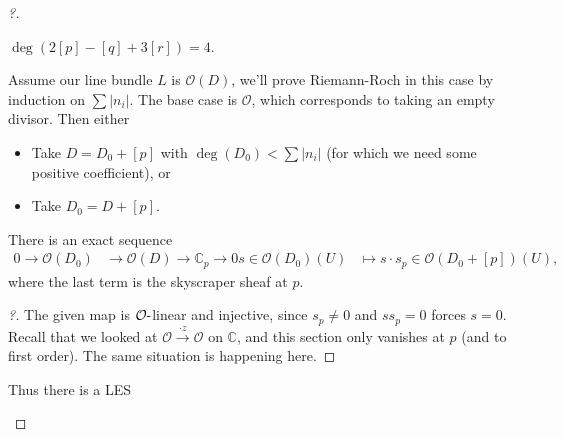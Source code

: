 \begin{proof}[?]
\begin{example}[?]
\(\deg( 2[p] -[q] + 3[r]) = 4\).

\end{example}

Assume our line bundle \(L\) is \({\mathcal{O}}(D)\), we'll prove
Riemann-Roch in this case by induction on
\(\sum {\left\lvert {n_i} \right\rvert}\). The base case is
\({\mathcal{O}}\), which corresponds to taking an empty divisor. Then
either

\begin{itemize}
\tightlist
\item
  Take \(D = D_0 + [p]\) with
  \(\deg(D_0) < \sum {\left\lvert {n_i} \right\rvert}\) (for which we
  need some positive coefficient), or
\item
  Take \(D_0 = D + [p]\).
\end{itemize}

\begin{claim}

There is an exact sequence
\begin{align*}
0 \to {\mathcal{O}}(D_0) &\to {\mathcal{O}}(D) \to {\mathbb{C}}_p \to 0
s\in {\mathcal{O}}(D_0)(U) &\mapsto s \cdot s_p \in {\mathcal{O}}( D_0 + [p] ) (U)
,\end{align*}
where the last term is the skyscraper sheaf at \(p\).

\end{claim}

\begin{proof}[?]

The given map is \({\mathcal{O}}{\hbox{-}}\)linear and injective, since
\(s_p\neq 0\) and \(s s_p=0\) forces \(s=0\). Recall that we looked at
\({\mathcal{O}}\xrightarrow{\cdot z} {\mathcal{O}}\) on
\({\mathbb{C}}\), and this section only vanishes at \(p\) (and to first
order). The same situation is happening here.

\end{proof}

Thus there is a LES

\begin{center}
\end{center}


\end{proof}
